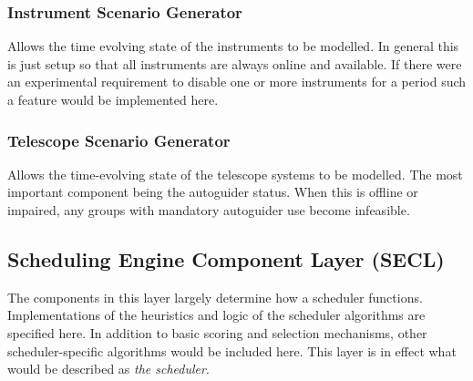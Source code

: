 \subsubsection{Instrument Scenario Generator}
\label{sect:sub_isg}
Allows the time evolving state of the instruments to be modelled. In general this is just setup so that all instruments are always online and available. If there were an experimental requirement to disable one or more instruments for a period such a feature would be implemented here.

\subsubsection{Telescope Scenario Generator}
\label{sect:sub_ssg}
Allows the time-evolving state of the telescope systems to be modelled. The most important component being the autoguider status. When this is offline or impaired, any groups with mandatory autoguider use become infeasible.

\subsection{Scheduling Engine Component Layer (SECL)}
The components in this layer largely determine how a scheduler functions. Implementations of the heuristics and logic of the scheduler algorithms are specified here. In addition to basic scoring and selection mechanisms, other scheduler-specific algorithms would be included here. This layer is in effect what would be described as \emph{the scheduler}. 

